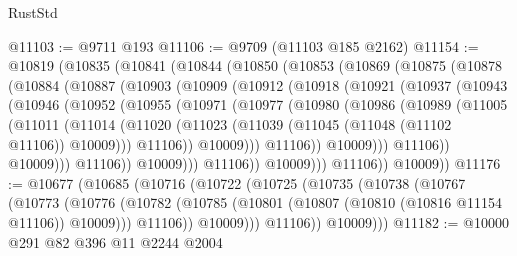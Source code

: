 \begin{lexlean}{RustStd}
\begin{coremodule}
@11103 := @9711 @193
@11106 := @9709 (@11103 @185 @2162)
@11154 := @10819
    (@10835
      (@10841
        (@10844
          (@10850
            (@10853
              (@10869
                (@10875
                  (@10878
                    (@10884
                      (@10887
                        (@10903
                          (@10909
                            (@10912
                              (@10918
                                (@10921
                                  (@10937
                                    (@10943
                                      (@10946
                                        (@10952
                                          (@10955
                                            (@10971
                                              (@10977
                                                (@10980
                                                  (@10986
                                                    (@10989
                                                      (@11005
                                                        (@11011
                                                          (@11014
                                                            (@11020
                                                              (@11023
                                                                (@11039
                                                                  (@11045
                                                                    (@11048 (@11102 @11106))
                                                                    @10009)))
                                                              @11106))
                                                          @10009)))
                                                    @11106))
                                                @10009)))
                                          @11106))
                                      @10009)))
                                @11106))
                            @10009)))
                      @11106))
                  @10009)))
            @11106))
        @10009))
@11176 := @10677
    (@10685
      (@10716
        (@10722
          (@10725
            (@10735
              (@10738
                (@10767
                  (@10773
                    (@10776
                      (@10782
                        (@10785 (@10801 (@10807 (@10810 (@10816 @11154 @11106)) @10009)))
                        @11106))
                    @10009)))
              @11106))
          @10009)))
@11182 := @10000 @291 @82 @396 @11 @2244 @2004

\end{coremodule}
\end{lexlean}
